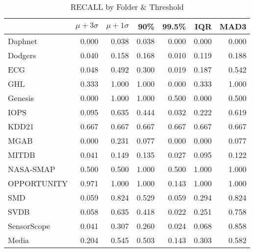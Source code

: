 \begin{table}
\caption{RECALL by Folder \& Threshold}
\label{tab:recall_by_folder}
\begin{tabular}{lrrrrrr}
\toprule
 & $\mu + 3\sigma$ & $\mu + 1\sigma$ & 90\% & 99.5\% & IQR & MAD3 \\
\midrule
Daphnet & 0.000 & 0.038 & 0.038 & 0.000 & 0.000 & 0.000 \\
Dodgers & 0.040 & 0.158 & 0.168 & 0.010 & 0.119 & 0.188 \\
ECG & 0.048 & 0.492 & 0.300 & 0.019 & 0.187 & 0.542 \\
GHL & 0.333 & 1.000 & 1.000 & 0.000 & 0.333 & 1.000 \\
Genesis & 0.000 & 1.000 & 1.000 & 0.500 & 0.000 & 0.500 \\
IOPS & 0.095 & 0.635 & 0.444 & 0.032 & 0.222 & 0.619 \\
KDD21 & 0.667 & 0.667 & 0.667 & 0.667 & 0.667 & 0.667 \\
MGAB & 0.000 & 0.231 & 0.077 & 0.000 & 0.000 & 0.077 \\
MITDB & 0.041 & 0.149 & 0.135 & 0.027 & 0.095 & 0.122 \\
NASA-SMAP & 0.500 & 0.500 & 1.000 & 0.500 & 1.000 & 1.000 \\
OPPORTUNITY & 0.971 & 1.000 & 1.000 & 0.143 & 1.000 & 1.000 \\
SMD & 0.059 & 0.824 & 0.529 & 0.059 & 0.294 & 0.824 \\
SVDB & 0.058 & 0.635 & 0.418 & 0.022 & 0.251 & 0.758 \\
SensorScope & 0.041 & 0.307 & 0.260 & 0.024 & 0.068 & 0.858 \\
Media & 0.204 & 0.545 & 0.503 & 0.143 & 0.303 & 0.582 \\
\bottomrule
\end{tabular}
\end{table}
